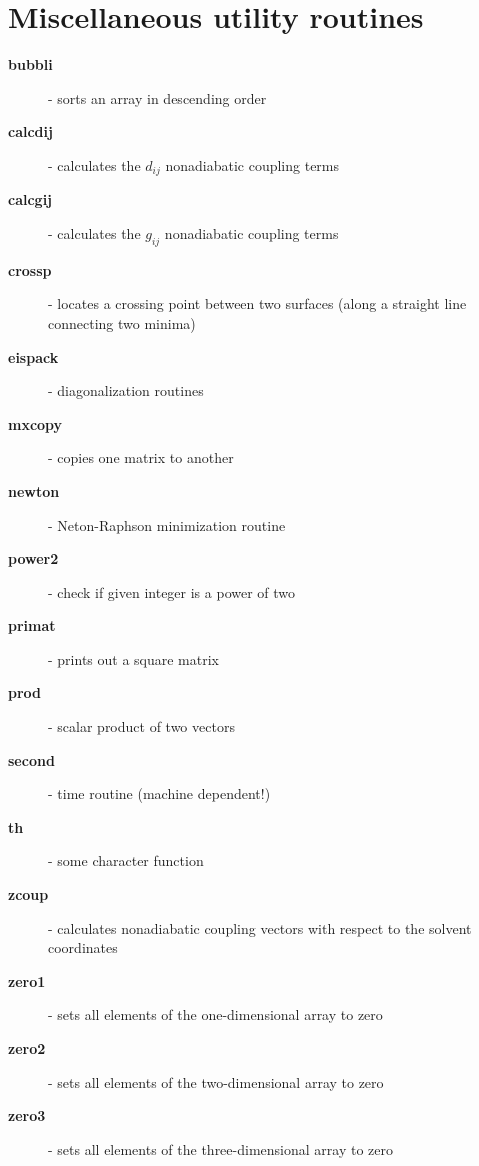 \documentclass[oneside,11pt,openany]{book}
\newcommand{\tw}{\ttfamily}
\begin{document}
\section{Miscellaneous utility routines}
\begin{description}
\item[{\tw\bf bubbli}] - sorts an array in descending order
\item[{\tw\bf calcdij}] - calculates the $d_{ij}$ nonadiabatic coupling terms
\item[{\tw\bf calcgij}] - calculates the $g_{ij}$ nonadiabatic coupling terms
\item[{\tw\bf crossp}] - locates a crossing point between two surfaces
                     (along a straight line connecting two minima)
\item[{\tw\bf eispack}] - diagonalization routines
\item[{\tw\bf mxcopy}] - copies one matrix to another
\item[{\tw\bf newton}] - Neton-Raphson minimization routine
\item[{\tw\bf power2}] - check if given integer is a power of two
\item[{\tw\bf primat}] - prints out a square matrix
\item[{\tw\bf prod}] - scalar product of two vectors
\item[{\tw\bf second}] - time routine (machine dependent!)
\item[{\tw\bf th}] - some character function
\item[{\tw\bf zcoup}] - calculates nonadiabatic coupling vectors
                     with respect to the solvent coordinates
\item[{\tw\bf zero1}] - sets all elements of the one-dimensional array to zero
\item[{\tw\bf zero2}] - sets all elements of the two-dimensional array to zero
\item[{\tw\bf zero3}] - sets all elements of the three-dimensional array to zero
\end{description}


%
\end{document}
